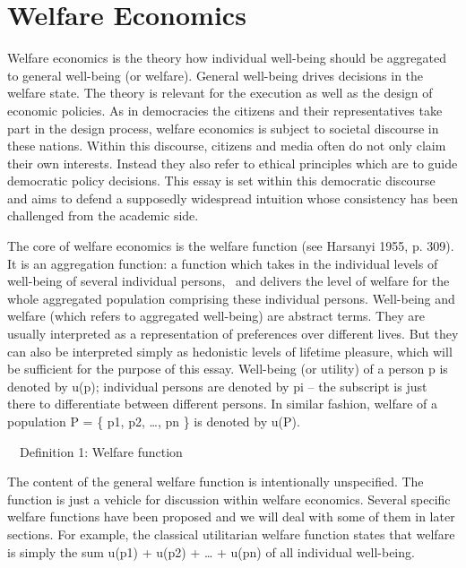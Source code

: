 \chapter{Welfare Economics}

Welfare economics is the theory how individual well-being should be aggregated to general well-being (or welfare). General well-being drives decisions in the welfare state. The theory is relevant for the execution as well as the design of economic policies. As in democracies the citizens and their representatives take part in the design process, welfare economics is subject to societal discourse in these nations. Within this discourse, citizens and media often do not only claim their own interests. Instead they also refer to ethical principles which are to guide democratic policy decisions. This essay is set within this democratic discourse and aims to defend a supposedly widespread intuition whose consistency has been challenged from the academic side.  

The core of welfare economics is the welfare function (see \label{ref:RNDwEYvso2F3F}Harsanyi 1955, p. 309). It is an aggregation function: a function which takes in the individual levels of well-being of several individual persons, \ and delivers the level of welfare for the whole aggregated population comprising these individual persons. Well-being and welfare (which refers to aggregated well-being) are abstract terms. They are usually interpreted as a representation of preferences over different lives. But they can also be interpreted simply as hedonistic levels of lifetime pleasure, which will be sufficient for the purpose of this essay. Well-being (or utility) of a person p is denoted by u(p); individual persons are denoted by pi – the subscript is just there to differentiate between different persons. In similar fashion, welfare of a population P = \{ p1, p2, …, pn \} is denoted by u(P). 

\ \ Definition 1: Welfare function 
\begin{comment}
\ \ w: \ \ [D835?][DCDF?]($\mathbb{R}$+) \ding{213} $\mathbb{R}$+, \ \ \ \ \{ u(p1), u(p2), …, u(pn) \} \ \ $\mapsto $ \ \ u( \{ p1, p2, …, pn \} ) 
\end{comment}

The content of the general welfare function is intentionally unspecified. The function is just a vehicle for discussion within welfare economics. Several specific welfare functions have been proposed and we will deal with some of them in later sections. For example, the classical utilitarian welfare function states that welfare is simply the sum u(p1) + u(p2) + … + u(pn) of all individual well-being.  

